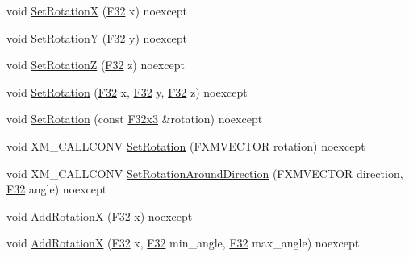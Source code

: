 \begin{DoxyCompactItemize}
\item 
void \mbox{\hyperlink{classmage_1_1_s_e_t_transform3_d_a33599ab17f4e0945ae5ef208293dbaad}{Set\+RotationX}} (\mbox{\hyperlink{namespacemage_aa97e833b45f06d60a0a9c4fc22ae02c0}{F32}} x) noexcept
\item 
void \mbox{\hyperlink{classmage_1_1_s_e_t_transform3_d_a66c95a6481b7f8b52df5690e90bb18e0}{Set\+RotationY}} (\mbox{\hyperlink{namespacemage_aa97e833b45f06d60a0a9c4fc22ae02c0}{F32}} y) noexcept
\item 
void \mbox{\hyperlink{classmage_1_1_s_e_t_transform3_d_a5e82593216de38f66df664b92985abed}{Set\+RotationZ}} (\mbox{\hyperlink{namespacemage_aa97e833b45f06d60a0a9c4fc22ae02c0}{F32}} z) noexcept
\item 
void \mbox{\hyperlink{classmage_1_1_s_e_t_transform3_d_a958f27ee959faf45b73dd223351cfac2}{Set\+Rotation}} (\mbox{\hyperlink{namespacemage_aa97e833b45f06d60a0a9c4fc22ae02c0}{F32}} x, \mbox{\hyperlink{namespacemage_aa97e833b45f06d60a0a9c4fc22ae02c0}{F32}} y, \mbox{\hyperlink{namespacemage_aa97e833b45f06d60a0a9c4fc22ae02c0}{F32}} z) noexcept
\item 
void \mbox{\hyperlink{classmage_1_1_s_e_t_transform3_d_aeb9b877245e7414c80336f85bb7d8eff}{Set\+Rotation}} (const \mbox{\hyperlink{namespacemage_a1e3c7a882af461f161caa1cbddaf1fa2}{F32x3}} \&rotation) noexcept
\item 
void X\+M\+\_\+\+C\+A\+L\+L\+C\+O\+NV \mbox{\hyperlink{classmage_1_1_s_e_t_transform3_d_ab01e80e33a479957cec03b4bb90ed811}{Set\+Rotation}} (F\+X\+M\+V\+E\+C\+T\+OR rotation) noexcept
\item 
void X\+M\+\_\+\+C\+A\+L\+L\+C\+O\+NV \mbox{\hyperlink{classmage_1_1_s_e_t_transform3_d_a7bd81603a36f4f8edc09a28e74948c31}{Set\+Rotation\+Around\+Direction}} (F\+X\+M\+V\+E\+C\+T\+OR direction, \mbox{\hyperlink{namespacemage_aa97e833b45f06d60a0a9c4fc22ae02c0}{F32}} angle) noexcept
\item 
void \mbox{\hyperlink{classmage_1_1_s_e_t_transform3_d_af85aa4dca6e651d563afa74af2fb04bd}{Add\+RotationX}} (\mbox{\hyperlink{namespacemage_aa97e833b45f06d60a0a9c4fc22ae02c0}{F32}} x) noexcept
\item 
void \mbox{\hyperlink{classmage_1_1_s_e_t_transform3_d_a87199f5c1a5b2ba9836bd6e7d932fb75}{Add\+RotationX}} (\mbox{\hyperlink{namespacemage_aa97e833b45f06d60a0a9c4fc22ae02c0}{F32}} x, \mbox{\hyperlink{namespacemage_aa97e833b45f06d60a0a9c4fc22ae02c0}{F32}} min\+\_\+angle, \mbox{\hyperlink{namespacemage_aa97e833b45f06d60a0a9c4fc22ae02c0}{F32}} max\+\_\+angle) noexcept
\item 

\end{DoxyCompactItemize}
